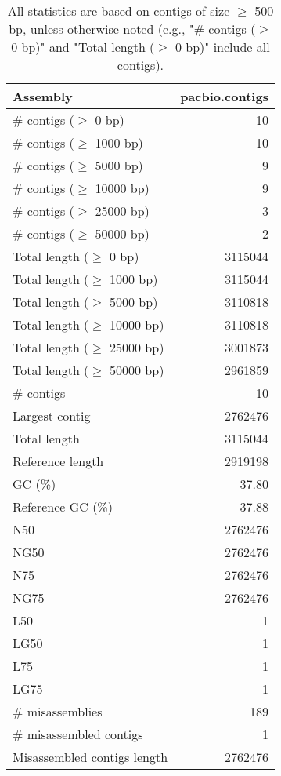 \documentclass[12pt,a4paper]{article}
\begin{document}
\begin{table}[ht]
\begin{center}
\caption{All statistics are based on contigs of size $\geq$ 500 bp, unless otherwise noted (e.g., "\# contigs ($\geq$ 0 bp)" and "Total length ($\geq$ 0 bp)" include all contigs).}
\begin{tabular}{|l*{1}{|r}|}
\hline
Assembly & pacbio.contigs \\ \hline
\# contigs ($\geq$ 0 bp) & 10 \\ \hline
\# contigs ($\geq$ 1000 bp) & 10 \\ \hline
\# contigs ($\geq$ 5000 bp) & 9 \\ \hline
\# contigs ($\geq$ 10000 bp) & 9 \\ \hline
\# contigs ($\geq$ 25000 bp) & 3 \\ \hline
\# contigs ($\geq$ 50000 bp) & 2 \\ \hline
Total length ($\geq$ 0 bp) & 3115044 \\ \hline
Total length ($\geq$ 1000 bp) & 3115044 \\ \hline
Total length ($\geq$ 5000 bp) & 3110818 \\ \hline
Total length ($\geq$ 10000 bp) & 3110818 \\ \hline
Total length ($\geq$ 25000 bp) & 3001873 \\ \hline
Total length ($\geq$ 50000 bp) & 2961859 \\ \hline
\# contigs & 10 \\ \hline
Largest contig & 2762476 \\ \hline
Total length & 3115044 \\ \hline
Reference length & 2919198 \\ \hline
GC (\%) & 37.80 \\ \hline
Reference GC (\%) & 37.88 \\ \hline
N50 & 2762476 \\ \hline
NG50 & 2762476 \\ \hline
N75 & 2762476 \\ \hline
NG75 & 2762476 \\ \hline
L50 & 1 \\ \hline
LG50 & 1 \\ \hline
L75 & 1 \\ \hline
LG75 & 1 \\ \hline
\# misassemblies & 189 \\ \hline
\# misassembled contigs & 1 \\ \hline
Misassembled contigs length & 2762476 \\ \hline

\end{tabular}
\end{center}
\end{table}
\end{document}
